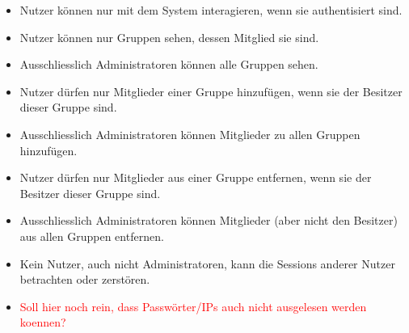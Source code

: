 \documentclass[12pt,DIV14,BCOR10mm,a4paper,parskip=half-,english,ngerman,bibliography=totocnumbered]{scrreprt}
\begin{document}
\begin{itemize}
  \item Nutzer können nur mit dem System interagieren, wenn sie authentisiert sind.
  \item Nutzer können nur Gruppen sehen, dessen Mitglied sie sind.
  \item Ausschliesslich Administratoren können alle Gruppen sehen.
  \item Nutzer dürfen nur Mitglieder einer Gruppe hinzufügen, wenn sie der Besitzer dieser Gruppe sind.
  \item Ausschliesslich Administratoren können Mitglieder zu allen Gruppen hinzufügen.
  \item Nutzer dürfen nur Mitglieder aus einer Gruppe entfernen, wenn sie der Besitzer dieser Gruppe sind.
  \item Ausschliesslich Administratoren können Mitglieder (aber nicht den Besitzer) aus allen Gruppen entfernen.
  \item Kein Nutzer, auch nicht Administratoren, kann die Sessions anderer Nutzer betrachten oder zerstören.
  \item \textcolor{red}{Soll hier noch rein, dass Passwörter/IPs auch nicht ausgelesen werden koennen?}
\end{itemize}

\clearpage

\printbibliography

\printacronyms[title=Abkürzungsverzeichnis,toctitle=Abkürzungsverzeichnis]
\printglossary[type=main]

\end{document}
